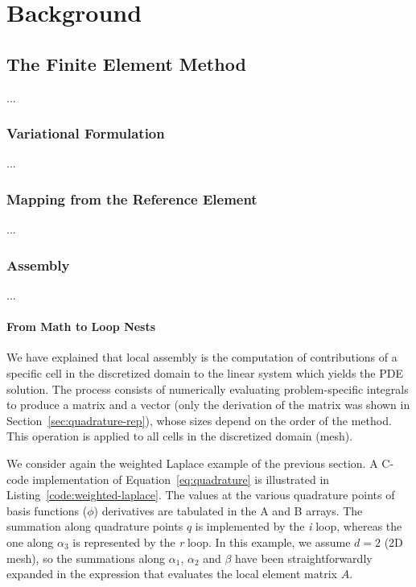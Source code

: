 \chapter{Background}

\section{The Finite Element Method}
\label{sec:bkg:fem}
...

\subsection{Variational Formulation}
\label{sec:bkg:coffee-var-problems}
...

\subsection{Mapping from the Reference Element}
\label{sec:bkg:mapping}
...

\subsection{Assembly}
\label{sec:bkg:assembly}
...

\subsubsection{From Math to Loop Nests}
\label{sec:bkg:mathcode}
We have explained that local assembly is the computation of contributions of a specific cell in the discretized domain to the linear system which yields the PDE solution. The process consists of numerically evaluating problem-specific integrals to produce a matrix and a vector (only the derivation of the matrix was shown in Section~\ref{sec:quadrature-rep}), whose sizes depend on the order of the method. This operation is applied to all cells in the discretized domain (mesh).

We consider again the weighted Laplace example of the previous section. A C-code implementation of Equation~\ref{eq:quadrature} is illustrated in Listing~\ref{code:weighted-laplace}. The values at the various quadrature points of basis functions ($\phi$) derivatives are tabulated in the A and B arrays. The summation along quadrature points $q$ is implemented by the \emph{i} loop, whereas the one along $\alpha_3$ is represented by the \emph{r} loop. In this example, we assume $d=2$ (2D mesh), so the summations along $\alpha_1$, $\alpha_2$ and $\beta$ have been straightforwardly expanded in the expression that evaluates the local element matrix $A$. 

